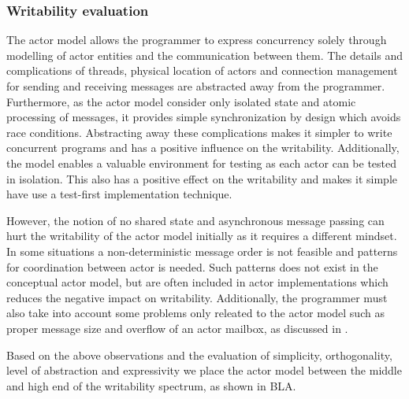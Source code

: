 \subsubsection{Writability evaluation}
The actor model allows the programmer to express concurrency solely through modelling of actor entities and the communication between them. The details and complications of threads, physical location of actors and connection management for sending and receiving messages are abstracted away from the programmer. Furthermore, as the actor model consider only isolated state and atomic processing of messages, it provides simple synchronization by design which avoids race conditions. Abstracting away these complications makes it simpler to write concurrent programs and has a positive influence on the writability. Additionally, the model enables a valuable environment for testing as each actor can be tested in isolation. This also has a positive effect on the writability and makes it simple have use a test-first implementation technique.

However, the notion of no shared state and asynchronous message passing can hurt the writability of the actor model initially as it requires a different mindset. In some situations a non-deterministic message order is not feasible and patterns for coordination between actor is needed. Such patterns does not exist in the conceptual actor model, but are often included in actor implementations which reduces the negative impact on writability. Additionally, the programmer must also take into account some problems only releated to the actor model such as proper message size and overflow of an actor mailbox, as discussed in .

Based on the above observations and the evaluation of simplicity, orthogonality, level of abstraction and expressivity we place the actor model between the middle and high end of the writability spectrum, as shown in BLA.



\worksheetend

